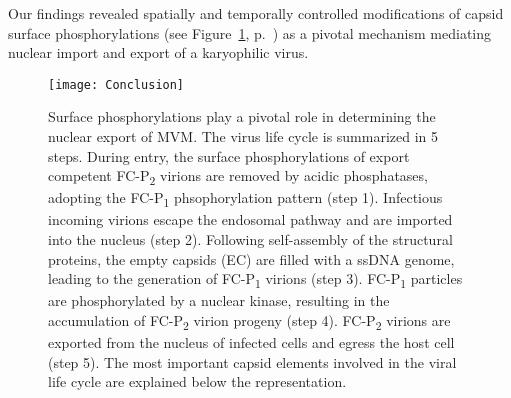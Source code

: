 \par
\medskip
Our findings revealed spatially and temporally controlled modifications of capsid surface phosphorylations (see Figure~\ref{Scheme}, p.~\pageref{Scheme}) as a pivotal mechanism mediating nuclear import and export of a karyophilic virus. 







\begin{figure}[H]
\centering
  \texttt{[image: Conclusion]}
  \caption[The pivotal role of capsid surface phosphorylations in the nuclear export of MVM.]
   {Surface phosphorylations play a pivotal role in determining the nuclear export of MVM. The virus life cycle is summarized in 5 steps. During entry, the surface phosphorylations of export competent FC-P\textsubscript{2} virions are removed by acidic phosphatases, adopting the FC-P\textsubscript{1} phsophorylation pattern (step 1). Infectious incoming virions escape the endosomal pathway and are imported into the nucleus (step 2). Following self-assembly of the structural proteins, the empty capsids (EC) are filled with a ssDNA genome, leading to the generation of FC-P\textsubscript{1} virions (step 3). FC-P\textsubscript{1} particles are phosphorylated by a nuclear kinase, resulting in the accumulation of FC-P\textsubscript{2} virion progeny (step 4). FC-P\textsubscript{2} virions are exported from the nucleus of infected cells and egress the host cell (step 5). The most important capsid elements involved in the viral life cycle are explained below the representation.} 
\label{Scheme}
\end{figure}















